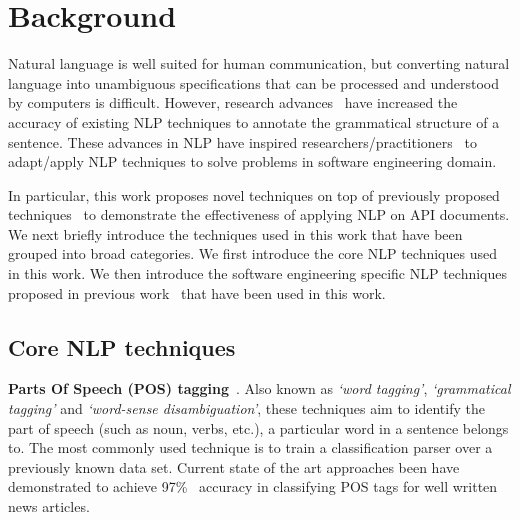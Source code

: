 \section{Background}
\label{sec:background}

Natural language is well suited for human communication, but converting natural language into unambiguous specifications that can be processed and understood by computers is difficult.
However, research advances~\cite{Marneffe06LREC,Marneffe08COLING,Klein03,KleinNIPS03} have increased the accuracy of existing NLP techniques to annotate the grammatical structure of a sentence.
These advances in NLP have inspired researchers/practitioners~\cite{pandita12:inferring, pandita13:WHYPER, johnSlankasPASSAT13, XiaoFSE2012, thummalapentaICSE12} to adapt/apply NLP techniques to solve problems in software engineering domain.

In particular, this work proposes novel techniques on top of previously proposed techniques~\cite{pandita12:inferring, pandita13:WHYPER} to demonstrate the effectiveness of applying NLP on API documents.
We next briefly introduce the techniques used in this work that have been grouped into broad categories.
We first introduce the core NLP techniques used in this work.
We then introduce the software engineering specific NLP techniques proposed in previous work~\cite{pandita12:inferring,pandita13:WHYPER} that have been used in this work.

\subsection{Core NLP techniques}
\label{sub:CoreNLPback}



\textbf{Parts Of Speech (POS) tagging}~\cite{Klein03,KleinNIPS03}. Also known as \textit{`word tagging'}, \textit{`grammatical tagging'} and \textit{`word-sense disambiguation'}, these techniques aim to identify the part of speech (such as noun, verbs, etc.), a particular word in a sentence belongs to. The most commonly used technique is to train a classification parser over a previously known data set. Current state of the art approaches been have demonstrated to achieve 97\%~\cite{SNLP1} accuracy in classifying POS tags for well written news articles.

